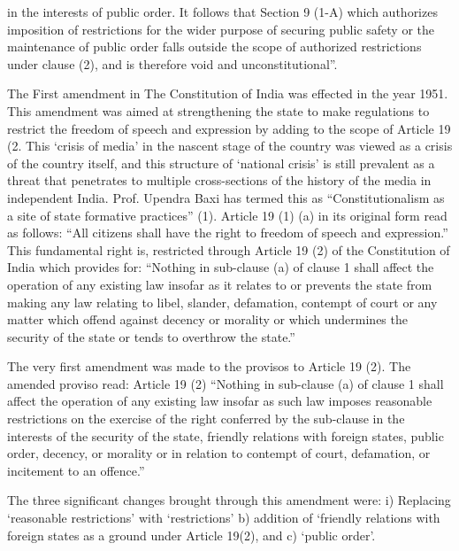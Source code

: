 \begin{multicols}{2}
in the interests of public order. It follows that Section 9 (1-A) which authorizes imposition of restrictions for the wider purpose of securing public safety or the maintenance of public order falls outside the scope of authorized restrictions under clause (2), and is therefore void and unconstitutional”.

\noi
The First amendment in The Constitution of India was effected in the year 1951. This amendment was aimed at strengthening the state to make regulations to restrict the freedom of speech and expression by adding to the scope of Article 19 (2. This ‘crisis of media’ in the nascent stage of the country was viewed as a crisis of the country itself, and this structure of ‘national crisis’ is still prevalent as a threat that penetrates to multiple cross-sections of the history of the media in independent India. Prof. Upendra Baxi has termed this as “Constitutionalism as a site of state formative practices” (1). Article 19 (1) (a) in its original form read as follows: “All citizens shall have the right to freedom of speech and expression.” This fundamental right is, restricted through Article 19 (2) of the Constitution of India which provides for: “Nothing in sub-clause (a) of clause 1 shall affect the operation of any existing law insofar as it relates to or prevents the state from making any law relating to libel, slander, defamation, contempt of court or any matter which offend against decency or morality or which undermines the security of the state or tends to overthrow the state.”

\noi
The very first amendment was made to the provisos to Article 19 (2). The amended proviso read: Article 19 (2) “Nothing in sub-clause (a) of clause 1 shall affect the operation of any existing law insofar as such law imposes reasonable restrictions on the exercise of the right conferred by the sub-clause in the interests of the security of the state, friendly relations with foreign states, public order, decency, or morality or in relation to contempt of court, defamation, or incitement to an offence.”

\noi
The three significant changes brought through this amendment were: i) Replacing ‘reasonable restrictions’ with ‘restrictions’ b) addition of ‘friendly relations with foreign states as a ground under Article 19(2), and c) ‘public order’.


\end{multicols}
